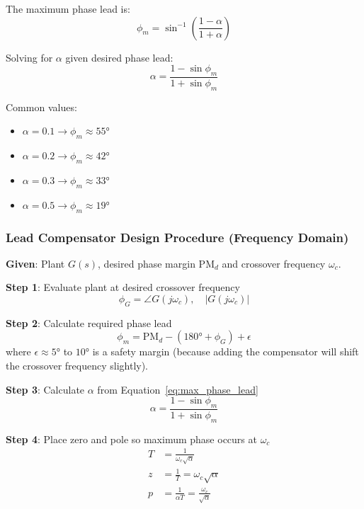 The maximum phase lead is:
\begin{equation}
\phi_m = \sin^{-1}\left(\frac{1-\alpha}{1+\alpha}\right)
\label{eq:max_phase_lead}
\end{equation}

Solving for $\alpha$ given desired phase lead:
\begin{equation}
\alpha = \frac{1 - \sin\phi_m}{1 + \sin\phi_m}
\end{equation}

Common values:
\begin{itemize}
    \item $\alpha = 0.1 \rightarrow \phi_m \approx 55°$
    \item $\alpha = 0.2 \rightarrow \phi_m \approx 42°$
    \item $\alpha = 0.3 \rightarrow \phi_m \approx 33°$
    \item $\alpha = 0.5 \rightarrow \phi_m \approx 19°$
\end{itemize}


\subsubsection{Lead Compensator Design Procedure (Frequency Domain)}

\textbf{Given}: Plant $G(s)$, desired phase margin PM$_d$ and crossover frequency $\omega_c$.

\textbf{Step 1}: Evaluate plant at desired crossover frequency
\begin{equation}
\phi_G = \angle G(j\omega_c), \quad |G(j\omega_c)|
\end{equation}

\textbf{Step 2}: Calculate required phase lead
\begin{equation}
\phi_m = \text{PM}_d - (180° + \phi_G) + \epsilon
\end{equation}
where $\epsilon \approx 5°$ to $10°$ is a safety margin (because adding the compensator will shift the crossover frequency slightly).

\textbf{Step 3}: Calculate $\alpha$ from Equation~\eqref{eq:max_phase_lead}
\begin{equation}
\alpha = \frac{1 - \sin\phi_m}{1 + \sin\phi_m}
\end{equation}

\textbf{Step 4}: Place zero and pole so maximum phase occurs at $\omega_c$
\begin{align}
T &= \frac{1}{\omega_c \sqrt{\alpha}} \\
z &= \frac{1}{T} = \omega_c \sqrt{\alpha} \\
p &= \frac{1}{\alpha T} = \frac{\omega_c}{\sqrt{\alpha}}
\end{align}

